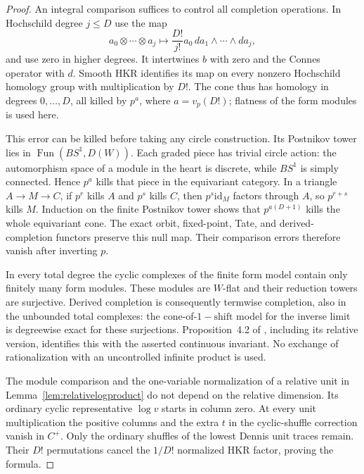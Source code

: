 \documentclass[11pt,a4paper]{article}
\theoremstyle{remark}
\begin{document}
\begin{proof}
An integral comparison suffices to control all completion operations.
In Hochschild degree $j\leq D$ use the map
\[
 a_0\otimes\cdots\otimes a_j\longmapsto
       \frac{D!}{j!}a_0\,da_1\wedge\cdots\wedge da_j,
\]
and use zero in higher degrees. It intertwines $b$ with zero and
the Connes operator with $d$. Smooth HKR identifies its map on every
nonzero Hochschild homology group with multiplication by $D!$.
The cone thus has homology in degrees $0,\ldots,D$, all killed by
$p^a$, where $a=v_p(D!)$; flatness of the form modules is used here.

This error can be killed before taking any circle construction.
Its Postnikov tower lies in $\operatorname{Fun}(BS^1,D(W))$.
Each graded piece has trivial circle action: the automorphism
space of a module in the heart is discrete, while $BS^1$ is simply
connected. Hence $p^a$ kills that piece in the equivariant category.
In a triangle $A\to M\to C$, if $p^r$ kills $A$ and $p^s$ kills
$C$, then $p^s\mathrm{id}_M$ factors through $A$, so $p^{r+s}$
kills $M$. Induction on the finite Postnikov tower shows that
$p^{a(D+1)}$ kills the whole equivariant cone.
The exact orbit, fixed-point, Tate, and derived-completion functors
preserve this null map. Their comparison errors therefore vanish
after inverting $p$.

In every total degree the cyclic complexes of the finite form
model contain only finitely many form modules. These modules are
$W$-flat and their reduction towers are surjective. Derived
completion is consequently termwise completion, also in the
unbounded total complexes: the cone-of-$1-\mathrm{shift}$ model
for the inverse limit is degreewise exact for these surjections.
Proposition~4.2 of \cite{AMMN}, including its relative version,
identifies this with the asserted continuous invariant. No exchange
of rationalization with an uncontrolled infinite product is used.

The module comparison and the one-variable normalization of a
relative unit in Lemma~\ref{lem:relativelogproduct} do not depend
on the relative dimension. Its ordinary cyclic representative
$\log v$ starts in column zero. At every unit multiplication the
positive columns and the extra $t$ in the cyclic-shuffle correction
vanish in $C^+$. Only the ordinary shuffles of the lowest Dennis
unit traces remain. Their $D!$ permutations cancel the $1/D!$
normalized HKR factor, proving the formula.
\end{proof}
\end{document}
